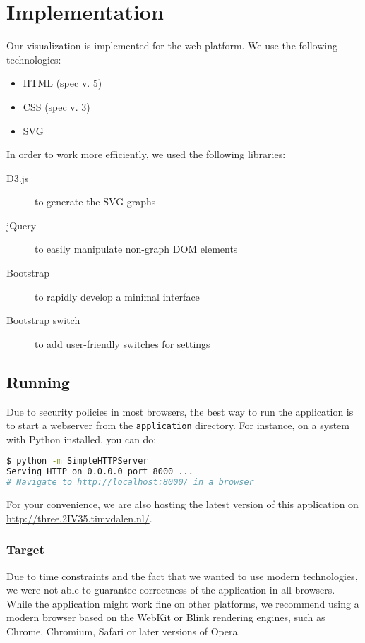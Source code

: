 \section{Implementation}\label{Sec:Imp}

	Our visualization is implemented for the web platform.
	We use the following technologies:

	\begin{itemize}
		\item HTML (spec v. 5)
		\item CSS (spec v. 3)
		\item SVG
	\end{itemize}

	In order to work more efficiently, we used the following libraries:

	\begin{description}
		\item[D3.js] to generate the SVG graphs
		\item[jQuery] to easily manipulate non-graph DOM elements
		\item[Bootstrap] to rapidly develop a minimal interface
		\item[Bootstrap switch] to add user-friendly switches for settings
	\end{description}

	\subsection{Running}
		Due to security policies in most browsers, the best way to run the application is to start a webserver from the \texttt{application} directory.
		For instance, on a system with Python installed, you can do:

		\begin{lstlisting}[language=bash]
$ python -m SimpleHTTPServer
Serving HTTP on 0.0.0.0 port 8000 ...
# Navigate to http://localhost:8000/ in a browser
		\end{lstlisting}

		For your convenience, we are also hosting the latest version of this application on \url{http://three.2IV35.timvdalen.nl/}.

		\subsubsection{Target}
			Due to time constraints and the fact that we wanted to use modern technologies, we were not able to guarantee correctness of the application in all browsers.
			While the application might work fine on other platforms, we recommend using a modern browser based on the WebKit or Blink rendering engines, such as Chrome, Chromium, Safari or later versions of Opera.

